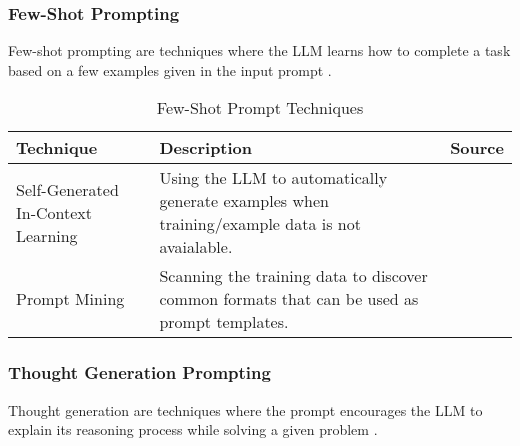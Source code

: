\FloatBarrier

\subsubsection{Few-Shot Prompting}

Few-shot prompting are techniques where the LLM learns how to complete a task based on a few examples given in the input prompt \parencite{prompt1}.

\begin{table}[h!]
    \centering
    \begin{tabular}{p{3cm} p{8cm} p{2cm}}
        \toprule
        \textbf{Technique} & \textbf{Description} & \textbf{Source} \\
        \midrule
        \raggedright
        Self-Generated In-Context Learning & Using the LLM to automatically generate examples when training/example data is not avaialable. & \textcite{self-generating} \\
        \hline
        \raggedright
        Prompt Mining & Scanning the training data to discover common formats that can be used as prompt templates. & \textcite{mining} \\
        \bottomrule
    \end{tabular}
    \caption{Few-Shot Prompt Techniques}
    \label{tab:few_shot}
\end{table}

\FloatBarrier

\subsubsection{Thought Generation Prompting}

Thought generation are techniques where the prompt encourages the LLM to explain its reasoning process while solving a given problem \parencite{prompt1}.

